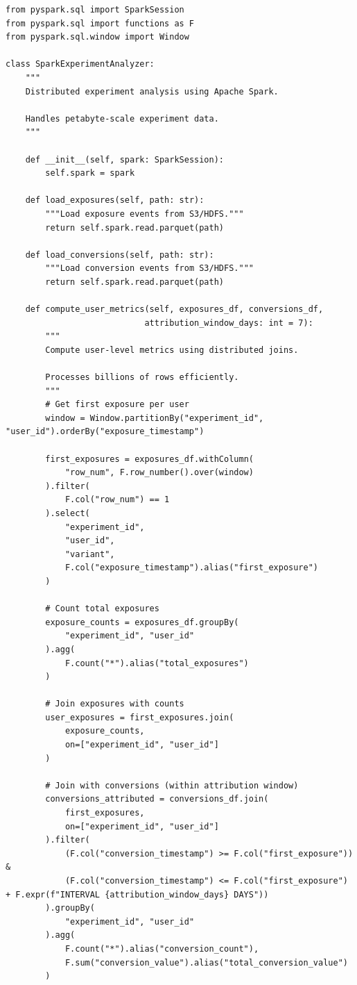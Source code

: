 \lstset{language=Python, caption=Experiment Analysis with PySpark}
\begin{lstlisting}
from pyspark.sql import SparkSession
from pyspark.sql import functions as F
from pyspark.sql.window import Window

class SparkExperimentAnalyzer:
    """
    Distributed experiment analysis using Apache Spark.

    Handles petabyte-scale experiment data.
    """

    def __init__(self, spark: SparkSession):
        self.spark = spark

    def load_exposures(self, path: str):
        """Load exposure events from S3/HDFS."""
        return self.spark.read.parquet(path)

    def load_conversions(self, path: str):
        """Load conversion events from S3/HDFS."""
        return self.spark.read.parquet(path)

    def compute_user_metrics(self, exposures_df, conversions_df,
                            attribution_window_days: int = 7):
        """
        Compute user-level metrics using distributed joins.

        Processes billions of rows efficiently.
        """
        # Get first exposure per user
        window = Window.partitionBy("experiment_id", "user_id").orderBy("exposure_timestamp")

        first_exposures = exposures_df.withColumn(
            "row_num", F.row_number().over(window)
        ).filter(
            F.col("row_num") == 1
        ).select(
            "experiment_id",
            "user_id",
            "variant",
            F.col("exposure_timestamp").alias("first_exposure")
        )

        # Count total exposures
        exposure_counts = exposures_df.groupBy(
            "experiment_id", "user_id"
        ).agg(
            F.count("*").alias("total_exposures")
        )

        # Join exposures with counts
        user_exposures = first_exposures.join(
            exposure_counts,
            on=["experiment_id", "user_id"]
        )

        # Join with conversions (within attribution window)
        conversions_attributed = conversions_df.join(
            first_exposures,
            on=["experiment_id", "user_id"]
        ).filter(
            (F.col("conversion_timestamp") >= F.col("first_exposure")) &
            (F.col("conversion_timestamp") <= F.col("first_exposure") + F.expr(f"INTERVAL {attribution_window_days} DAYS"))
        ).groupBy(
            "experiment_id", "user_id"
        ).agg(
            F.count("*").alias("conversion_count"),
            F.sum("conversion_value").alias("total_conversion_value")
        )


\end{lstlisting}
